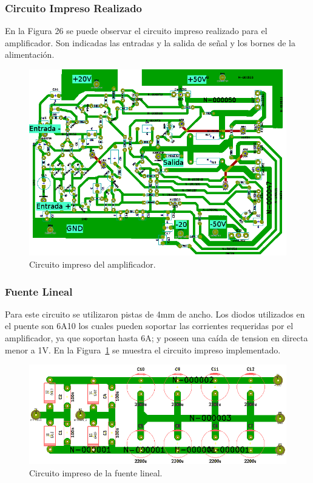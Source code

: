 \subsubsection{Circuito Impreso Realizado}

En la Figura 26 se puede observar el circuito impreso realizado para el amplificador. Son indicadas las entradas y la salida de señal y los bornes de la alimentación.

\begin{figure}[H]
\centerline{
\includegraphics[width=1\textwidth]{img/PCB1.png}}
\caption{Circuito impreso del amplificador.}
\end{figure}

\subsubsection{Fuente Lineal}
\medskip
Para este circuito se utilizaron pistas de 4mm de ancho. Los diodos utilizados en el puente son 6A10 los cuales pueden soportar las corrientes requeridas por el amplificador, ya que soportan hasta 6A; y poseen una caída de tension en directa menor a 1V.
En la Figura~\ref{circuito_impreso_fuente_lineal} se muestra el circuito impreso implementado. 



\begin{figure}[H]
\centering
\centerline{\includegraphics[width=1\textwidth]{img/circuito_impreso_fuente_lineal.png}}
\caption{Circuito impreso de la fuente lineal.}
\label{circuito_impreso_fuente_lineal} 
\end{figure}
\medskip
